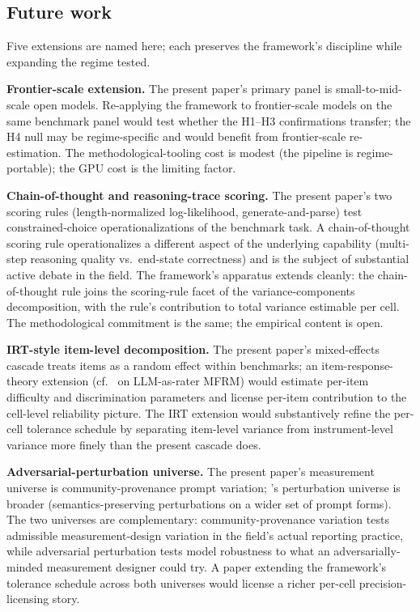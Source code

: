 \documentclass[11pt]{article}
\begin{document}
\subsection{Future work}
\label{sec:future-work}

Five extensions are named here; each preserves the framework's discipline while expanding the regime tested.

\textbf{Frontier-scale extension.} The present paper's primary panel is small-to-mid-scale open models. Re-applying the framework to frontier-scale models on the same benchmark panel would test whether the H1--H3 confirmations transfer; the H4 null may be regime-specific and would benefit from frontier-scale re-estimation. The methodological-tooling cost is modest (the pipeline is regime-portable); the GPU cost is the limiting factor.

\textbf{Chain-of-thought and reasoning-trace scoring.} The present paper's two scoring rules (length-normalized log-likelihood, generate-and-parse) test constrained-choice operationalizations of the benchmark task. A chain-of-thought scoring rule operationalizes a different aspect of the underlying capability (multi-step reasoning quality vs.\ end-state correctness) and is the subject of substantial active debate in the field. The framework's apparatus extends cleanly: the chain-of-thought rule joins the scoring-rule facet of the variance-components decomposition, with the rule's contribution to total variance estimable per cell. The methodological commitment is the same; the empirical content is open.

\textbf{IRT-style item-level decomposition.} The present paper's mixed-effects cascade treats items as a random effect within benchmarks; an item-response-theory extension (cf.~\citet{sui2025evaluating} on LLM-as-rater MFRM) would estimate per-item difficulty and discrimination parameters and license per-item contribution to the cell-level reliability picture. The IRT extension would substantively refine the per-cell tolerance schedule by separating item-level variance from instrument-level variance more finely than the present cascade does.

\textbf{Adversarial-perturbation universe.} The present paper's measurement universe is community-provenance prompt variation; \citet{romanou2026brittlebench}'s perturbation universe is broader (semantics-preserving perturbations on a wider set of prompt forms). The two universes are complementary: community-provenance variation tests admissible measurement-design variation in the field's actual reporting practice, while adversarial perturbation tests model robustness to what an adversarially-minded measurement designer could try. A paper extending the framework's tolerance schedule across both universes would license a richer per-cell precision-licensing story.
\end{document}
